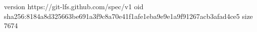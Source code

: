version https://git-lfs.github.com/spec/v1
oid sha256:8184a8d325663be691a3f9c8a70e41f1afe1eba9e9e1a9f91267acb3afad4ce5
size 7674
